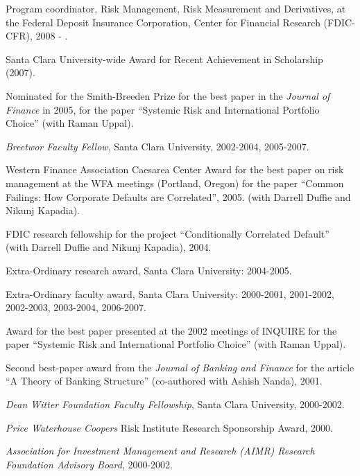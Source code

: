 \documentclass{article}
\begin{document}
\begin{description}
\begin{etaremune}
\item Program coordinator, Risk Management, Risk Measurement and Derivatives, at the Federal Deposit Insurance Corporation, Center for Financial Research (FDIC-CFR), 2008 - .

\item Santa Clara University-wide Award for Recent Achievement in Scholarship (2007). 

\item Nominated for the Smith-Breeden Prize for the best paper in the {\it Journal of Finance} in 2005, for the paper ``Systemic Risk and International Portfolio Choice'' (with Raman Uppal). 

\item {\it Breetwor Faculty Fellow}, Santa Clara University, 2002-2004,
2005-2007.

\item Western Finance Association Caesarea Center Award 
for the best paper on risk management at the WFA meetings
(Portland, Oregon) for the paper ``Common Failings:
How Corporate Defaults are Correlated'', 2005.  (with Darrell
Duffie and Nikunj Kapadia).

\item FDIC research fellowship for the project 
``Conditionally Correlated Default'' (with Darrell
Duffie and Nikunj Kapadia), 2004. 

\item Extra-Ordinary research award, Santa Clara University: 2004-2005.

\item Extra-Ordinary faculty award, Santa Clara University: 2000-2001, 
2001-2002, 2002-2003, 2003-2004, 2006-2007.

\item Award for the best paper presented at the 2002 meetings
of INQUIRE for the paper ``Systemic Risk and International Portfolio
Choice'' (with Raman Uppal). 

\item Second best-paper award from the {\it Journal of Banking and
Finance} for the article ``A Theory of Banking Structure'' (co-authored
with Ashish Nanda), 2001.

\item {\it Dean Witter Foundation Faculty Fellowship}, Santa Clara University,
2000-2002.

\item {\it Price Waterhouse Coopers} Risk Institute Research Sponsorship
Award, 2000.

\item {\it Association for Investment Management and Research (AIMR)
 Research Foundation Advisory Board}, 2000-2002.


\end{etaremune}
\end{description}
\end{document}

